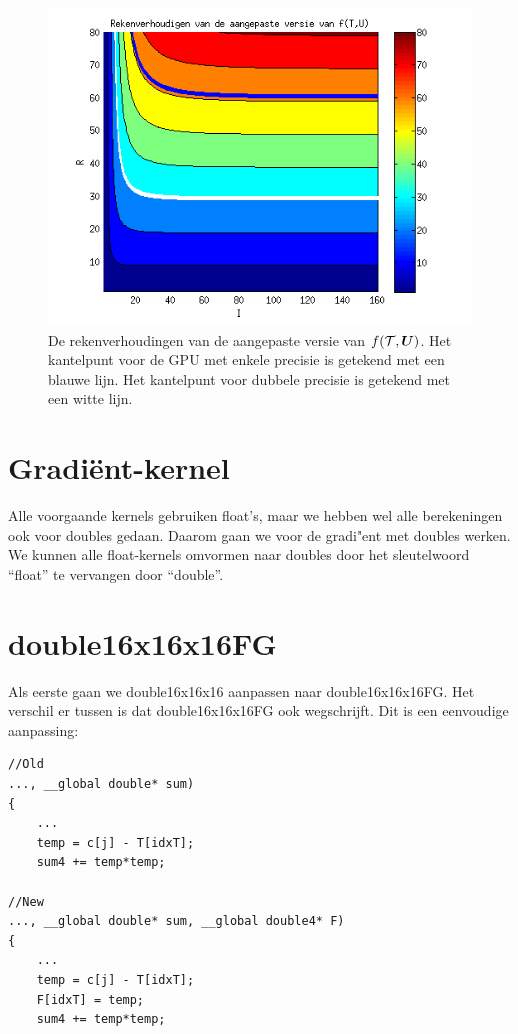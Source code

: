 \begin{figure}
\centering
\includegraphics{haalFG}
\caption{\label{haalFG}De rekenverhoudingen van de aangepaste versie van $f(\mathcal{T}, \boldsymbol{U})$. Het kantelpunt voor de GPU met enkele precisie is getekend met een blauwe lijn. Het kantelpunt voor dubbele precisie is getekend met een witte lijn.}
\end{figure}

\section{Gradi\"ent-kernel}
Alle voorgaande kernels gebruiken float's, maar we hebben wel alle berekeningen ook voor doubles gedaan. Daarom gaan we voor de gradi"ent met doubles werken. We kunnen alle float-kernels omvormen naar doubles door het sleutelwoord ``float'' te vervangen door ``double''.

\section{double16x16x16FG}
Als eerste gaan we double16x16x16 aanpassen naar double16x16x16FG. Het verschil er tussen is dat double16x16x16FG ook \FF{} wegschrijft. Dit is een eenvoudige aanpassing:
\begin{lstlisting}
//Old
..., __global double* sum)
{
	...
	temp = c[j] - T[idxT];
	sum4 += temp*temp;

//New
..., __global double* sum, __global double4* F)
{
	...
	temp = c[j] - T[idxT];
	F[idxT] = temp;
	sum4 += temp*temp;
\end{lstlisting}

